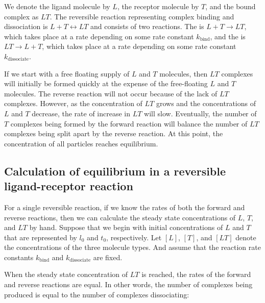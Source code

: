 \begin{note}\end{note}

We denote the ligand molecule by $L$, the receptor molecule by $T$, and the bound complex as $LT$. The reversible reaction representing complex binding and dissociation is $L + T \longleftrightarrow LT$ and consists of two reactions. The  is $L + T \rightarrow LT$, which takes place at a rate depending on some rate constant $k_\text{bind}$, and the  is $LT \rightarrow L + T$, which takes place at a rate depending on some rate constant $k_\text{dissociate}$.

If we start with a free floating supply of $L$ and $T$ molecules, then $LT$ complexes will initially be formed quickly at the expense of the free-floating $L$ and $T$ molecules. The reverse reaction will not occur because of the lack of $LT$ complexes. However, as the concentration of $LT$ grows and the concentrations of $L$ and $T$ decrease, the rate of increase in $LT$ will slow. Eventually, the number of $T$ complexes being formed by the forward reaction will balance the number of $LT$ complexes being split apart by the reverse reaction. At this point, the concentration of all particles reaches equilibrium.

\FloatBarrier
{}
\subsection{Calculation of equilibrium in a reversible ligand-receptor reaction}

For a single reversible reaction, if we know the rates of both the forward and reverse reactions, then we can calculate the steady state concentrations of $L$, $T$, and $LT$ by hand.  Suppose that we begin with initial concentrations of $L$ and $T$ that are represented by $l_0$ and $t_0$, respectively. Let $[L]$, $[T]$, and $[LT]$ denote the concentrations of the three molecule types. And assume that the reaction rate constants $k_\text{bind}$ and $k_\text{dissociate}$ are fixed.

When the steady state concentration of $LT$ is reached, the rates of the forward and reverse reactions are equal. In other words, the number of complexes being produced is equal to the number of complexes dissociating:

